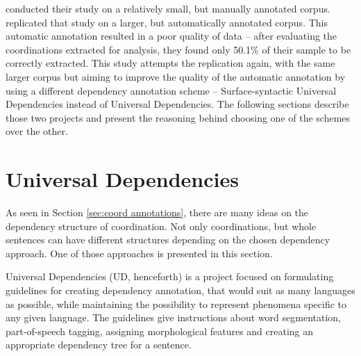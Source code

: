 \cite{prz:woz:23} conducted their study on a relatively small, but manually annotated corpus. \cite{prz:etal:24} replicated that study on a larger, but automatically annotated corpus. This automatic annotation resulted in a poor quality of data -- after evaluating the coordinations extracted for analysis, they found only 50.1\% of their sample to be correctly extracted. This study attempts the replication again, with the same larger corpus but aiming to improve the quality of the automatic annotation by using a different dependency annotation scheme -- Surface-syntactic Universal Dependencies instead of Universal Dependencies. The following sections describe those two projects and present the reasoning behind choosing one of the schemes over the other.

\section{Universal Dependencies}\label{sec:ud}

As seen in Section \ref{sec:coord annotations}, there are many ideas on the dependency structure of coordination. Not only coordinations, but whole sentences can have different structures depending on the chosen dependency approach. One of those approaches is presented in this section.

Universal Dependencies (UD, henceforth) is a project focused on formulating guidelines for creating dependency annotation, that would suit as many languages as possible, while maintaining the possibility to represent phenomena specific to any given language. The guidelines give instructions about word segmentation, part-of-speech tagging, assigning morphological features and creating an appropriate dependency tree for a sentence. 

